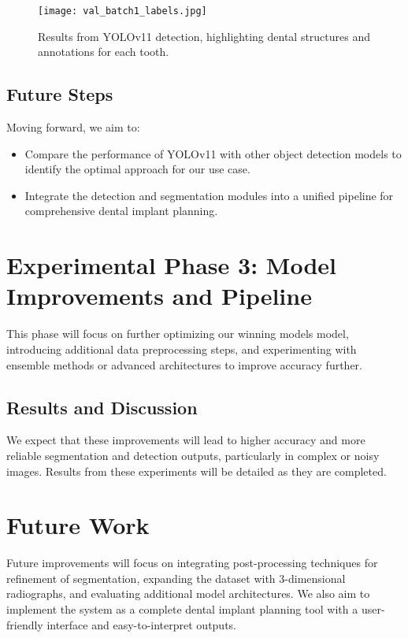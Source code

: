 \documentclass[12pt]{article}
\begin{document}
\begin{figure}[H]
    \centering
    \texttt{[image: val\_batch1\_labels.jpg]}
    \caption{Results from YOLOv11 detection, highlighting dental structures and annotations for each tooth.}
    \label{fig:yolo-output}
\end{figure}

\newpage

\subsection{Future Steps}
Moving forward, we aim to:
\begin{itemize}
    \item Compare the performance of YOLOv11 with other object detection models to identify the optimal approach for our use case.
    \item Integrate the detection and segmentation modules into a unified pipeline for comprehensive dental implant planning.
\end{itemize}

\section{Experimental Phase 3: Model Improvements and Pipeline}
This phase will focus on further optimizing our winning models model, introducing additional data preprocessing steps, and experimenting with ensemble methods or advanced architectures to improve accuracy further.

\subsection{Results and Discussion}
We expect that these improvements will lead to higher accuracy and more reliable segmentation and detection outputs, particularly in complex or noisy images. Results from these experiments will be detailed as they are completed.

\section{Future Work}
Future improvements will focus on integrating post-processing techniques for refinement of segmentation, expanding the dataset with 3-dimensional radiographs, and evaluating additional model architectures. We also aim to implement the system as a complete dental implant planning tool with a user-friendly interface and easy-to-interpret outputs.
\end{document}
